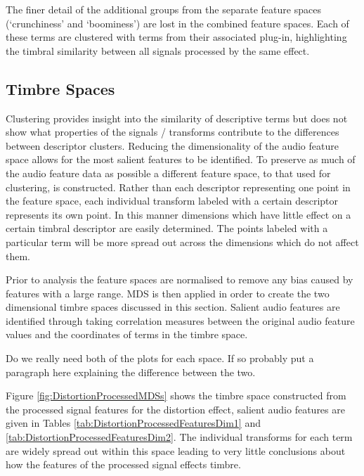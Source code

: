 		The finer detail of the additional groups from the separate feature spaces (`crunchiness' and `boominess')
		are lost in the combined feature spaces. Each of these terms are clustered with terms from their associated
		plug-in, highlighting the timbral similarity between all signals processed by the same effect.

	\subsection{Timbre Spaces}
	\label{sec:TimbreEvaluation-Analysis-TimbreSpaces}
		Clustering provides insight into the similarity of descriptive terms but does not show what properties of
		the signals / transforms contribute to the differences between descriptor clusters. Reducing the
		dimensionality of the audio feature space allows for the most salient features to be identified. To preserve
		as much of the audio feature data as possible a different feature space, to that used for clustering, is
		constructed. Rather than each descriptor representing one point in the feature space, each individual
		transform labeled with a certain descriptor represents its own point. In this manner dimensions which have
		little effect on a certain timbral descriptor are easily determined. The points labeled with a particular
		term will be more spread out across the dimensions which do not affect them. 
		
		Prior to analysis the feature spaces are normalised to remove any bias caused by features with a large
		range. MDS is then applied in order to create the two dimensional timbre spaces discussed in this section.
		Salient audio features are identified through taking correlation measures between the original audio feature
		values and the coordinates of terms in the timbre space.

		\note
		{
			Do we really need both of the plots for each space. If so probably put a paragraph here explaining
			the difference between the two.
		}

		Figure \ref{fig:DistortionProcessedMDSs} shows the timbre space constructed from the processed signal
		features for the distortion effect, salient audio features are given in Tables
		\ref{tab:DistortionProcessedFeaturesDim1} and \ref{tab:DistortionProcessedFeaturesDim2}. The individual
		transforms for each term are widely spread out within this space leading to very little conclusions about
		how the features of the processed signal effects timbre.

